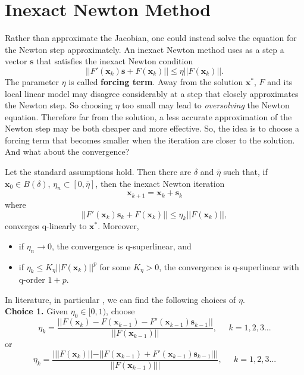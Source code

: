 \section{Inexact Newton Method} \label{inexact_Newton_method} Rather than approximate the Jacobian, one could instead solve the equation for the Newton step approximately. An inexact Newton method uses as a step a vector $\textbf{s}$ that satisfies the inexact Newton condition
\begin{equation}
||F'(\textbf{x}_k)\textbf{s}+F(\textbf{x}_k)|| \leq \eta ||F(\textbf{x}_k)||.
\label{inexact_newton}
\end{equation}
The parameter $\eta$ is called \textbf{forcing term}. Away from the solution $\textbf{x}^*$, $F$ and its local linear model may disagree considerably at a step that closely approximates the Newton step. So choosing $\eta$ too small may lead to \textit{oversolving} the Newton equation. Therefore far from the solution, a less accurate approximation of the Newton step may be both cheaper and more effective. So, the idea is to choose a forcing term that becomes smaller when the iteration are closer to the solution. And what about the convergence?
\begin{theorem} \label{convergenza_IN}
	Let the standard assumptions hold. Then there are $\delta$ and $\bar{\eta}$ such that, if $\textbf{x}_0 \in \mathit{B}(\delta)$, ${\eta_n}\subset [0,\bar{\eta}]$, then the inexact Newton iteration
	\begin{equation*}
	\textbf{x}_{k+1} = \textbf{x}_k + \textbf{s}_k
	\end{equation*}
	where
   \begin{equation*}
   ||F'(\textbf{x}_k)\textbf{s}_k+F(\textbf{x}_k)|| \leq \eta_k ||F(\textbf{x}_k)||,
   \end{equation*}
	converges q-linearly to $\textbf{x}^*$. Moreover, 
	\begin{itemize}
		\item if $\eta_n \rightarrow 0$, the convergence is q-superlinear, and 
		\item if $\eta_k \leq K_{\eta} ||F(\textbf{x}_k) ||^p$ for some $K_{\eta}>0$, the convergence is q-superlinear with q-order $1+p$.
	\end{itemize}
	
\end{theorem}
In literature, in particular \cite{Forcingterm}, we can find the following choices of $\eta$. \\
\noindent \textbf{Choice 1.} Given $\eta_0 \in [0,1)$, choose
\begin{equation}
\eta_k=\frac{||F(\textbf{x}_k) - F(\textbf{x}_{k-1}) - F'(\textbf{x}_{k-1})\textbf{s}_{k-1} ||}{||F(\textbf{x}_{k-1})||},\;\;\;\;\; k=1,2,3...
\label{Choice1.1}
\end{equation}
or
\begin{equation}
\eta_k=\frac{| ||F(\textbf{x}_k)|| - ||F(\textbf{x}_{k-1}) + F'(\textbf{x}_{k-1})\textbf{s}_{k-1} |||}{||F(\textbf{x}_{k-1})|| |},\;\;\;\;\; k=1,2,3...
\label{Choice1.2}
\end{equation}


